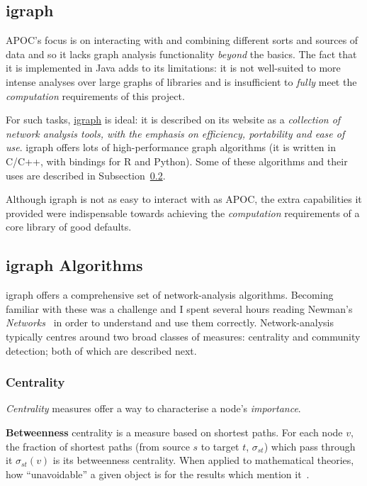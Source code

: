 \subsection{igraph}\label{subsubsec:neo4jtoolsigraph}

APOC's focus is on interacting with and combining different sorts and sources of
data and so it lacks graph analysis functionality \emph{beyond} the basics. The
fact that it is implemented in Java adds to its limitations: it is not
well-suited to more intense analyses over large graphs of libraries and is
insufficient to \emph{fully} meet the \emph{computation} requirements of this
project.

For such tasks, \href{http://www.igraph.org}{igraph} is ideal: it is described
on its website as a \emph{collection of network analysis tools, with the
emphasis on efficiency, portability and ease of use}. igraph offers lots of
high-performance graph algorithms (it is written in C/C++, with bindings for R
and Python). Some of these algorithms and their uses are described in
Subsection~\ref{subsec:igraphalg}.

Although igraph is not as easy to interact with  as APOC, the extra capabilities
it provided were indispensable towards achieving the \emph{computation}
requirements of a core library of good defaults.

\subsection{igraph Algorithms}\label{subsec:igraphalg}

igraph offers a comprehensive set of network-analysis algorithms. Becoming
familiar with these was a challenge and I spent several hours reading Newman's
\emph{Networks}~{\citep{newman2008}} in order to understand and use them correctly.
Network-analysis typically centres around two broad classes of measures:
centrality and community detection; both of which are described next.

\subsubsection{Centrality}

\emph{Centrality} measures offer a way to characterise a node's \emph{importance}.

\textbf{Betweenness} centrality is a measure based on shortest paths. For each
node $v$, the fraction of shortest paths (from source $s$ to target $t$,
$\sigma_{st}$) which pass through it $\sigma_{st}\left(v\right)$ is its
betweenness centrality. When applied to mathematical theories, how
``unavoidable'' a given object is for the results which mention
it~{\citep{freeman1977}}.

